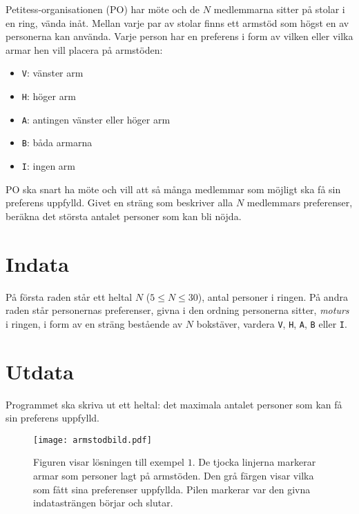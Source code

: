 
Petitess-organisationen (PO) har möte och de $N$ medlemmarna sitter på
stolar i en ring, vända inåt. Mellan varje par av stolar finns ett armstöd som högst en av personerna kan använda. Varje person har en preferens i form av vilken eller vilka armar hen vill placera på armstöden:
\begin{itemize}
\item \texttt{V}: vänster arm
\item \texttt{H}: höger arm
\item \texttt{A}: antingen vänster eller höger arm
\item \texttt{B}: båda armarna
\item \texttt{I}: ingen arm
\end{itemize}

PO ska snart ha möte och vill att så många medlemmar som möjligt ska få sin preferens uppfylld. Givet en sträng som beskriver alla $N$ medlemmars preferenser, beräkna det största antalet personer som kan bli nöjda.

\section*{Indata}
På första raden står ett heltal $N$ ($5\le N \le 30$), antal personer i ringen. På andra raden står personernas preferenser, givna i den ordning
personerna sitter, {\em moturs} i ringen, i form av en
sträng bestående av $N$ bokstäver, vardera \texttt{V}, \texttt{H},
\texttt{A}, \texttt{B} eller \texttt{I}. 

\section*{Utdata}
Programmet ska skriva ut ett heltal: det maximala antalet personer som kan få sin preferens uppfylld.

\begin{figure}[!htb]
\begin{center}
\texttt{[image: armstodbild.pdf]}
\end{center}
\caption{Figuren visar lösningen till exempel $1$. De tjocka linjerna markerar
armar som personer lagt på armstöden. Den grå färgen visar vilka som fått sina preferenser uppfyllda. Pilen markerar var den givna
indatasträngen börjar och slutar.}
\end{figure}

